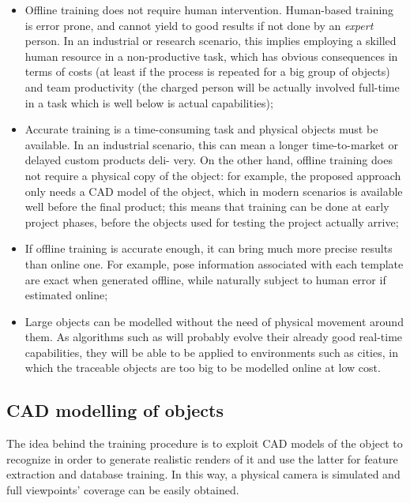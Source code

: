 \begin{itemize}
  \item{Offline training does not require human intervention. Human-based
      training is error prone, and cannot yield to good results if not done by an
      \emph{expert} person. In an industrial or research scenario, this implies
      employing a skilled human resource in a non-productive task, which has obvious
      consequences in terms of costs (at least if the process is repeated
      for a big group of objects) and team productivity (the charged person will be
      actually involved full-time in a task which is well below is actual
    capabilities);}
  \item{Accurate training is a time-consuming task and physical objects must be available. In an
      industrial scenario, this can mean a longer time-to-market or delayed custom products deli-
      very. On the other hand, offline training does not require a physical copy of the object: for
      example, the proposed approach only needs a CAD model of the object, which in modern
      scenarios is available well before the final product; this means that training can be done at
      early project phases, before the objects used for testing the project actually
    arrive;}
  \item{If offline training is accurate enough, it can bring much more precise results than online
      one. For example, pose information associated with each template are exact when generated
    offline, while naturally subject to human error if estimated online;}
  \item{Large objects can be modelled without the need of physical movement around them. As
      algorithms such as \cite{linemod-pipeline} will probably evolve their already good real-time capabilities, they will
      be able to be applied to environments such as cities, in which the traceable objects are too
    big to be modelled online at low cost.}
\end{itemize}

\subsection{CAD modelling of objects} \label{sec:cad-mesh}
The idea behind the training procedure is to exploit CAD models of the object
to recognize in order to generate realistic renders of it and use the latter
for feature extraction and database training. In this way, a physical camera is
simulated and full viewpoints' coverage can be easily obtained.

